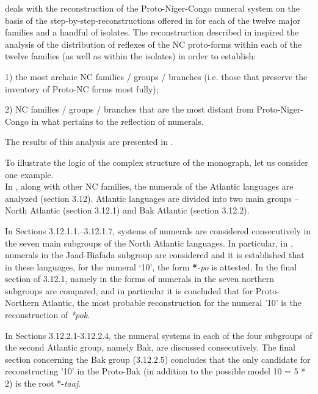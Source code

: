  deals with the reconstruction of the Proto-Niger-Congo numeral system on the basis of the step-by-step-reconstructions offered in  for each of the twelve major families and a handful of isolates.  
The reconstruction described in  inspired the analysis of the distribution of reflexes of the NC proto-forms within each of the twelve families (as well as within the isolates) in order to establish:

1) the most archaic NC families / groups / branches (i.e. those that preserve the inventory of Proto-NC forms most fully); 

2) NC families / groups / branches that are the most distant from Proto-Niger-Congo in what pertains to the reflection of numerals. 

The results of this analysis are presented in .

To illustrate the logic of the complex structure of the monograph, let us consider one example.\\

In , along with other NC families, the numerals of the Atlantic languages are analyzed (section 3.12). Atlantic languages are divided into two main groups – North Atlantic (section 3.12.1) and Bak Atlantic (section 3.12.2).

In Sections 3.12.1.1.–3.12.1.7, systems of numerals are considered consecutively in the seven main subgroups of the North Atlantic languages. In particular, in , numerals in the Jaad-Biafada subgroup are considered and it is established that in these languages, for the numeral ‘10', the form \textbf{*}\textit{{}-po} is attested. In the final section of 3.12.1, namely in  the forms of numerals in the seven northern subgroups are compared, and in particular it is concluded that for Proto-Northern Atlantic, the most probable reconstruction for the numeral '10' is the reconstruction of \textit{*pok}.

In Sections 3.12.2.1-3.12.2.4, the numeral systems in each of the four subgroups of the second Atlantic group, namely Bak, are discussed consecutively. The final section concerning the Bak group (3.12.2.5) concludes that the only candidate for reconstructing '10' in the Proto-Bak (in addition to the possible model 10 = 5 * 2) is the root *-\textit{taaj}.

